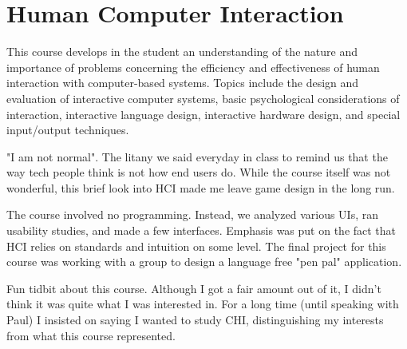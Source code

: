 \section{Human Computer Interaction}

\begin{meta}
\end{meta}


\coursedesc
This course develops in the student an understanding of the nature and
importance of problems concerning the efficiency and effectiveness of
human interaction with computer-based systems. Topics include the design
and evaluation of interactive computer systems, basic psychological
considerations of interaction, interactive language design, interactive
hardware design, and special input/output techniques.

\courseself
"I am not normal". The litany we said everyday in class to remind us
that the way tech people think is not how end users do. While the course
itself was not wonderful, this brief look into HCI made me leave game
design in the long run.

The course involved no programming. Instead, we analyzed various UIs,
ran usability studies, and made a few interfaces. Emphasis was put on the
fact that HCI relies on standards and intuition on some level. The final
project for this course was working with a group to design a language
free "pen pal" application.

Fun tidbit about this course. Although I got a fair amount out of it,
I didn't think it was quite what I was interested in. For a long time
(until speaking with Paul) I insisted on saying I wanted to study CHI,
distinguishing my interests from what this course represented.


